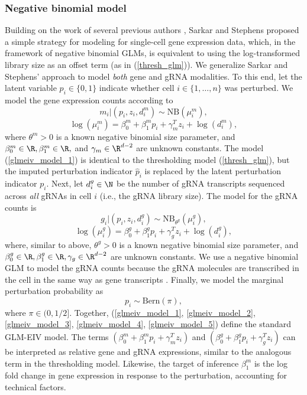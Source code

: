 \documentclass[12pt]{article}
\begin{document}
\subsubsection*{Negative binomial model}
Building on the work of several previous authors \cite{Townes2019,Svensson2020,Hafemeister2019}, Sarkar and Stephens \cite{Sarkar2021} proposed a simple strategy for modeling for single-cell gene expression data, which, in the framework of negative binomial GLMs, is equivalent to using the log-transformed library size as an offset term (as in (\ref{thresh_glm})). We generalize Sarkar and Stephens' approach to model \textit{both} gene and gRNA modalities. To this end, let the latent variable $p_i \in \{0,1\}$ indicate whether cell $i \in \{1, \dots, n\}$ was perturbed. We model the gene expression counts according to
\begin{equation}\label{glmeiv_model_1}
m_i |(p_i, z_i, d^m_i) \sim \textrm{NB}(\mu_i^m),
\end{equation}
\begin{equation}\label{glmeiv_model_2}
\log(\mu^m_i) = \beta^m_0 + \beta^m_1 p_i + \gamma_m^T z_i + \log(d^m_i),
\end{equation}
where $\theta^m > 0$ is a known negative binomial size parameter, and $\beta^m_0 \in \R, \beta^m_1 \in \R,$ and $\gamma_m \in \R^{d - 2}$ are unknown constants. The model (\ref{glmeiv_model_1}) is identical to the thresholding model (\ref{thresh_glm}), but the imputed perturbation indicator $\hat{p}_i$ is replaced by the latent perturbation indicator $p_i$. Next, let $d^g_i \in \N$ be the number of gRNA transcripts sequenced across \textit{all} gRNAs in cell $i$ (i.e., the gRNA library size). The model for the gRNA counts is 
\begin{equation}\label{glmeiv_model_3}
g_i | (p_i, z_i, d^g_i) \sim \textrm{NB}_{\theta^g}\left(\mu_i^g\right),
\end{equation}
\begin{equation}\label{glmeiv_model_4}
\log(\mu_i^g) = \beta^g_0 + \beta^g_1p_i + \gamma^T_g z_i + \log(d^g_i),
\end{equation}
where, similar to above, $\theta^g > 0$ is a known negative binomial size parameter, and $\beta^g_0 \in \R, \beta^g_1 \in \R, \gamma_g \in \R^{d - 2}$ are unknown constants. We use a negative binomial GLM to model the gRNA counts because the gRNA molecules are transcribed in the cell in the same way as gene transcripts \cite{Datlinger2017,Hill2018}. Finally, we model the marginal perturbation probability as
\begin{equation}\label{glmeiv_model_5}
p_i \sim \textrm{Bern}(\pi),
\end{equation} where $\pi \in (0,1/2]$. 
 Together, (\ref{glmeiv_model_1}, \ref{glmeiv_model_2}, \ref{glmeiv_model_3}, \ref{glmeiv_model_4}, \ref{glmeiv_model_5}) define the standard GLM-EIV model. The terms $(\beta^m_0 + \beta^m_1p_i + \gamma^T_m z_i)$ and $(\beta^g_0 + \beta^g_1 p_i + \gamma^T_g z_i)$ can be interpreted as relative gene and gRNA expressions, similar to the analogous term in the thresholding model. Likewise, the target of inference $\beta^m_1$ is the log fold change in gene expression in response to the perturbation, accounting for technical factors.
 
\end{document}
